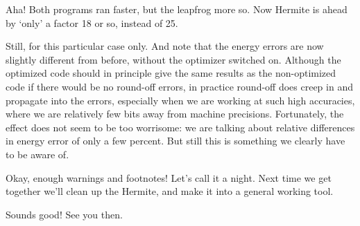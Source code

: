 \abc

\carol
Aha!  Both programs ran faster, but the leapfrog more so.  Now Hermite
is ahead by `only' a factor 18 or so, instead of 25.

\alice
Still, for this particular case only.  And note that the energy errors
are now slightly different from before, without the optimizer switched
on.  Although the optimized code should in principle give the same
results as the non-optimized code if there would be no round-off
errors, in practice round-off does creep in and propagate into the
errors, especially when we are working at such high accuracies, where
we are relatively few bits away from machine precisions.  Fortunately, 
the effect does not seem to be too worrisome: we are talking about
relative differences in energy error of only a few percent.  But still
this is something we clearly have to be aware of.

\bob
Okay, enough warnings and footnotes!  Let's call it a night.  Next
time we get together we'll clean up the Hermite, and make it into a
general working tool.

\carol
Sounds good!  See you then.

\cba
